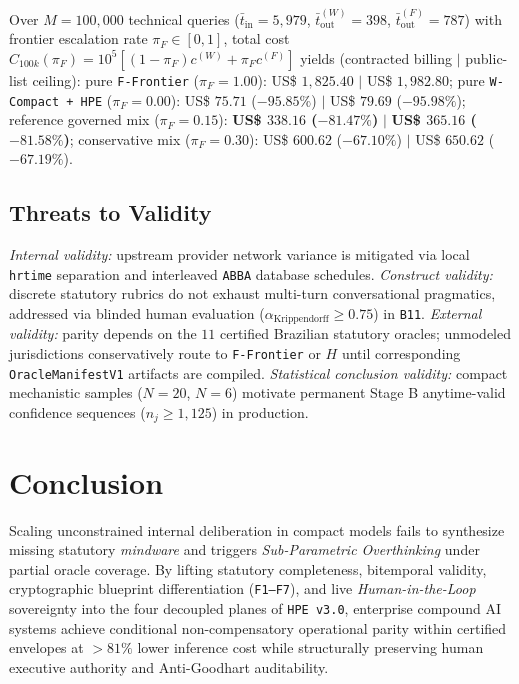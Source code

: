 \documentclass[10pt,twocolumn]{article}
\begin{document}
Over $M=100{,}000$ technical queries ($\bar{t}_{\mathrm{in}}=5{,}979$, $\bar{t}_{\mathrm{out}}^{(W)}=398$, $\bar{t}_{\mathrm{out}}^{(F)}=787$) with frontier escalation rate $\pi_F \in [0,1]$, total cost $C_{100k}(\pi_F) = 10^5[(1-\pi_F)c^{(W)} + \pi_F c^{(F)}]$ yields (contracted billing $|$ public-list ceiling): pure \texttt{F-Frontier} ($\pi_F=1.00$): US\$ $1{,}825.40$ $|$ US\$ $1{,}982.80$; pure \texttt{W-Compact + HPE} ($\pi_F=0.00$): US\$ $75.71$ ($-95.85\%$) $|$ US\$ $79.69$ ($-95.98\%$); reference governed mix ($\pi_F=0.15$): \textbf{US\$ $\mathbf{338.16}$ ($\mathbf{-81.47\%}$)} $|$ \textbf{US\$ $\mathbf{365.16}$ ($\mathbf{-81.58\%}$)}; conservative mix ($\pi_F=0.30$): US\$ $600.62$ ($-67.10\%$) $|$ US\$ $650.62$ ($-67.19\%$).

\subsection{Threats to Validity}

\emph{Internal validity:} upstream provider network variance is mitigated via local \texttt{hrtime} separation and interleaved \texttt{ABBA} database schedules. \emph{Construct validity:} discrete statutory rubrics do not exhaust multi-turn conversational pragmatics, addressed via blinded human evaluation ($\alpha_{\mathrm{Krippendorff}} \ge 0.75$) in \texttt{B11}. \emph{External validity:} parity depends on the $11$ certified Brazilian statutory oracles; unmodeled jurisdictions conservatively route to \texttt{F-Frontier} or $H$ until corresponding \texttt{OracleManifestV1} artifacts are compiled. \emph{Statistical conclusion validity:} compact mechanistic samples ($N=20$, $N=6$) motivate permanent Stage B anytime-valid confidence sequences ($n_j \ge 1{,}125$) in production.

\section{Conclusion}

Scaling unconstrained internal deliberation in compact models fails to synthesize missing statutory \emph{mindware} and triggers \emph{Sub-Parametric Overthinking} under partial oracle coverage. By lifting statutory completeness, bitemporal validity, cryptographic blueprint differentiation (\texttt{F1--F7}), and live \emph{Human-in-the-Loop} sovereignty into the four decoupled planes of \texttt{HPE v3.0}, enterprise compound AI systems achieve conditional non-compensatory operational parity within certified envelopes at $>81\%$ lower inference cost while structurally preserving human executive authority and Anti-Goodhart auditability.
\end{document}
